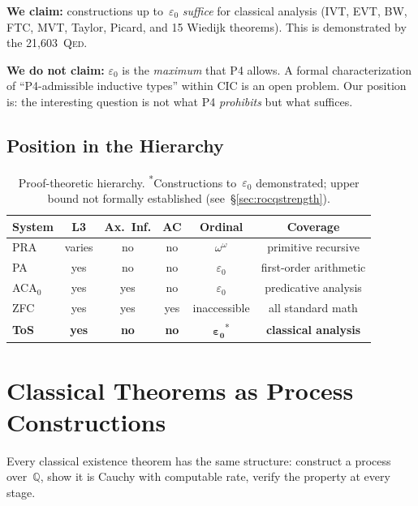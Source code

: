 \documentclass[11pt,a4paper]{article}
\theoremstyle{definition}
\theoremstyle{remark}
\newcommand{\Qed}{\textsc{Qed}}
\begin{document}
\begin{keyresult}
\textbf{We claim:} constructions up to~$\varepsilon_0$ \emph{suffice} for classical analysis (IVT, EVT, BW, FTC, MVT, Taylor, Picard, and 15 Wiedijk theorems).  This is demonstrated by the 21,603~\Qed.

\textbf{We do not claim:} $\varepsilon_0$ is the \emph{maximum} that P4 allows.  A formal characterization of ``P4-admissible inductive types'' within CIC is an open problem.  Our position is: the interesting question is not what P4 \emph{prohibits} but what suffices.
\end{keyresult}

\subsection{Position in the Hierarchy}

\begin{table}[h]
\centering
\begin{tabular}{lccccc}
\toprule
System & L3 & Ax.\ Inf. & AC & Ordinal & Coverage \\
\midrule
PRA         & varies & no  & no  & $\omega^\omega$ & primitive recursive \\
PA          & yes    & no  & no  & $\varepsilon_0$ & first-order arithmetic \\
ACA$_0$     & yes    & yes & no  & $\varepsilon_0$ & predicative analysis \\
ZFC         & yes    & yes & yes & inaccessible & all standard math \\
\midrule
\textbf{ToS} & \textbf{yes} & \textbf{no} & \textbf{no} & $\boldsymbol{\varepsilon_0}$\textsuperscript{*} & \textbf{classical analysis} \\
\bottomrule
\end{tabular}
\caption{Proof-theoretic hierarchy.  \textsuperscript{*}Constructions to~$\varepsilon_0$ demonstrated; upper bound not formally established (see~\S\ref{sec:rocqstrength}).}
\label{tab:hierarchy}
\end{table}


\section{Classical Theorems as Process Constructions}
\label{sec:theorems}

Every classical existence theorem has the same structure: construct a process over~$\mathbb{Q}$, show it is Cauchy with computable rate, verify the property at every stage.
\end{document}
